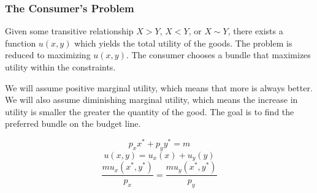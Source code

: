 \documentclass[letterpaper, 12pt]{article}
\begin{document}
\subsubsection{The Consumer's Problem}
Given some transitive relationship \( X>Y \), \( X<Y \), or \( X\sim Y \),
there exists a function \( u(x,y) \) which yields the total utility of the
goods. The problem is reduced to maximizing \( u(x,y) \). The consumer
chooses a bundle that maximizes utility within the constraints. \par
We will assume positive marginal utility, which means that more is always
better. We will also assume diminishing marginal utility, which means the
increase in utility is smaller the greater the quantity of the good. The
goal is to find the preferred bundle on the budget line.
\begin{center}
\end{center}
\[ p_{x}x^{*}+p_{y}y^{*} = m \]
\[ u(x,y) = u_{x}(x)+u_{y}(y) \]
\[ \frac{mu_{x}(x^{*},y^{*})}{p_{x}} = \frac{mu_{y}(x^{*},y^{*})}{p_{y}} \]
\end{document}
